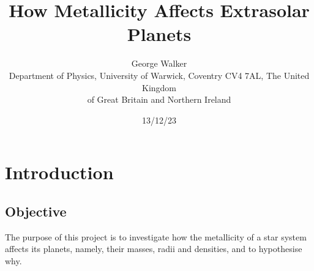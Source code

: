 \documentclass[a4paper,twocolumn,12pt]{article}
\begin{document}
\title{How Metallicity Affects Extrasolar Planets}

\author{George Walker \\
        \small
        Department of Physics, University of Warwick,
        Coventry CV4 7AL, The United Kingdom \\ \small of Great Britain and Northern Ireland}
\date{13/12/23}



\section{Introduction}
\label{section: Introduction}
\subsection{Objective}
\label{subsection: Objective}
The purpose of this project is to investigate how the metallicity of a star system affects its planets, namely, their masses, radii and densities, and to hypothesise why.


\end{document}
